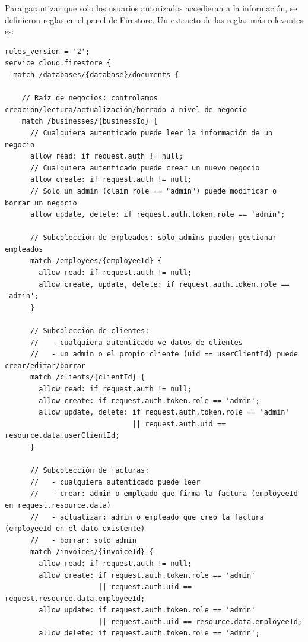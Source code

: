 \begin{large}

Para garantizar que solo los usuarios autorizados accedieran a la información, se definieron reglas en el panel de Firestore. Un extracto de las reglas más relevantes es:

\begin{lstlisting}[language={}, caption={Reglas de seguridad de Firestore}]
rules_version = '2';
service cloud.firestore {
  match /databases/{database}/documents {
    
    // Raíz de negocios: controlamos creación/lectura/actualización/borrado a nivel de negocio
    match /businesses/{businessId} {
      // Cualquiera autenticado puede leer la información de un negocio
      allow read: if request.auth != null;
      // Cualquiera autenticado puede crear un nuevo negocio
      allow create: if request.auth != null;
      // Solo un admin (claim role == "admin") puede modificar o borrar un negocio
      allow update, delete: if request.auth.token.role == 'admin';
      
      // Subcolección de empleados: solo admins pueden gestionar empleados
      match /employees/{employeeId} {
        allow read: if request.auth != null;
        allow create, update, delete: if request.auth.token.role == 'admin';
      }
      
      // Subcolección de clientes: 
      //   - cualquiera autenticado ve datos de clientes
      //   - un admin o el propio cliente (uid == userClientId) puede crear/editar/borrar
      match /clients/{clientId} {
        allow read: if request.auth != null;
        allow create: if request.auth.token.role == 'admin';
        allow update, delete: if request.auth.token.role == 'admin'
                              || request.auth.uid == resource.data.userClientId;
      }
      
      // Subcolección de facturas:
      //   - cualquiera autenticado puede leer
      //   - crear: admin o empleado que firma la factura (employeeId en request.resource.data)
      //   - actualizar: admin o empleado que creó la factura (employeeId en el dato existente)
      //   - borrar: solo admin
      match /invoices/{invoiceId} {
        allow read: if request.auth != null;
        allow create: if request.auth.token.role == 'admin'
                      || request.auth.uid == request.resource.data.employeeId;
        allow update: if request.auth.token.role == 'admin'
                      || request.auth.uid == resource.data.employeeId;
        allow delete: if request.auth.token.role == 'admin';
        

\end{lstlisting}
\end{large}
